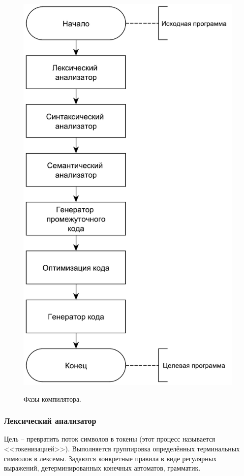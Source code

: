 \begin{figure}[h]
	\begin{center}
		{\includegraphics[scale = 0.53, page=1]{img/phases.pdf}}
		\caption{Фазы компилятора.}
		\label{fig:phases}
	\end{center}
\end{figure}

\subsubsection{Лексический анализатор}
Цель -- превратить поток символов в токены (этот процесс называется <<токенизацией>>). Выполняется группировка определённых терминальных символов в лексемы. Задаются конкретные правила в виде регулярных выражений, детерминированных конечных автоматов, грамматик. 

